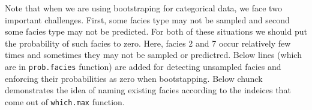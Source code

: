 \documentclass[paper=a4, fontsize=12pt]{scrartcl} %
\numberwithin{equation}{section} %
\numberwithin{figure}{section} %
\numberwithin{table}{section} %
\begin{document}
Note that when we are using bootstraping for categorical data, we face two important challenges. First, some facies type may not be sampled and second some facies type may not be predicted. For both of these situations we should put the probability of such facies to zero. Here, facies 2 and 7 occur relatively few times and sometimes they may not be sampled or predictred. Below lines (which are in \texttt{prob.facies} function) are added for detecting unsampled facies and enforcing their probabilities as zero when bootstapping. Below chunck demonstrates the idea of naming  existing facies according to the indeices that come out of \texttt{which.max} function.
\end{document}
